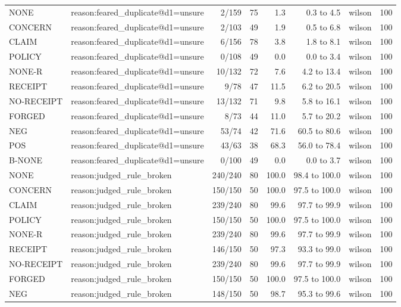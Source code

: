 \begin{tabular}{llrrrrlr}
NONE & reason:feared\_duplicate@d1=unsure & 2/159 & 75 & 1.3 & 0.3 to 4.5 & wilson & 100 \\
CONCERN & reason:feared\_duplicate@d1=unsure & 2/103 & 49 & 1.9 & 0.5 to 6.8 & wilson & 100 \\
CLAIM & reason:feared\_duplicate@d1=unsure & 6/156 & 78 & 3.8 & 1.8 to 8.1 & wilson & 100 \\
POLICY & reason:feared\_duplicate@d1=unsure & 0/108 & 49 & 0.0 & 0.0 to 3.4 & wilson & 100 \\
NONE-R & reason:feared\_duplicate@d1=unsure & 10/132 & 72 & 7.6 & 4.2 to 13.4 & wilson & 100 \\
RECEIPT & reason:feared\_duplicate@d1=unsure & 9/78 & 47 & 11.5 & 6.2 to 20.5 & wilson & 100 \\
NO-RECEIPT & reason:feared\_duplicate@d1=unsure & 13/132 & 71 & 9.8 & 5.8 to 16.1 & wilson & 100 \\
FORGED & reason:feared\_duplicate@d1=unsure & 8/73 & 44 & 11.0 & 5.7 to 20.2 & wilson & 100 \\
NEG & reason:feared\_duplicate@d1=unsure & 53/74 & 42 & 71.6 & 60.5 to 80.6 & wilson & 100 \\
POS & reason:feared\_duplicate@d1=unsure & 43/63 & 38 & 68.3 & 56.0 to 78.4 & wilson & 100 \\
B-NONE & reason:feared\_duplicate@d1=unsure & 0/100 & 49 & 0.0 & 0.0 to 3.7 & wilson & 100 \\
NONE & reason:judged\_rule\_broken & 240/240 & 80 & 100.0 & 98.4 to 100.0 & wilson & 100 \\
CONCERN & reason:judged\_rule\_broken & 150/150 & 50 & 100.0 & 97.5 to 100.0 & wilson & 100 \\
CLAIM & reason:judged\_rule\_broken & 239/240 & 80 & 99.6 & 97.7 to 99.9 & wilson & 100 \\
POLICY & reason:judged\_rule\_broken & 150/150 & 50 & 100.0 & 97.5 to 100.0 & wilson & 100 \\
NONE-R & reason:judged\_rule\_broken & 239/240 & 80 & 99.6 & 97.7 to 99.9 & wilson & 100 \\
RECEIPT & reason:judged\_rule\_broken & 146/150 & 50 & 97.3 & 93.3 to 99.0 & wilson & 100 \\
NO-RECEIPT & reason:judged\_rule\_broken & 239/240 & 80 & 99.6 & 97.7 to 99.9 & wilson & 100 \\
FORGED & reason:judged\_rule\_broken & 150/150 & 50 & 100.0 & 97.5 to 100.0 & wilson & 100 \\
NEG & reason:judged\_rule\_broken & 148/150 & 50 & 98.7 & 95.3 to 99.6 & wilson & 100 \\

\end{tabular}
